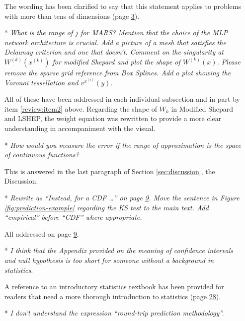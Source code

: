 \begin{itemize}[leftmargin=.5cm]
The wording has been clarified to say that this statement applies to problems with more than tens of dimensions (page \hyperlink{page.3}{3}).

\item[*] {\it What is the range of $j$ for MARS? Mention that the choice of the MLP network architecture is crucial. Add a picture of a mesh that satisfies the Delaunay criterion and one that doesn’t. Comment on the singularity at $W^{(k)}(x^{(k)})$ for modified Shepard and plot the shape of $W^{(k)}(x)$. Please remove the sparse grid reference from Box Splines. Add a plot showing the Voronoi tessellation and $v^{x^{(i)}}(y)$.}\vspace{.2cm}

All of these have been addressed in each individual subsection and in part by item \ref{review:item2} above. Regarding the shape of $W_k$ in Modified Shepard and LSHEP, the weight equation was rewritten to provide a more clear understanding in accompaniment with the visual.

\item[*] {\it How would you measure the error if the range of approximation is the space of continuous functions?}\vspace{.2cm}

This is answered in the last paragraph of Section \ref{sec:discussion}, the Discussion.

\item[*] {\it Rewrite as ``Instead, for a CDF \ldots'' on page \hyperlink{page.9}{9}. Move the sentence in Figure \ref{fig:prediction-example} regarding the KS test to the main text. Add ``empirical'' before ``CDF'' where appropriate.}\vspace{.2cm}

All addressed on page \hyperlink{page.9}{9}.

\item[*] {\it I think that the Appendix provided on the meaning of confidence intervals and null hypothesis is too short for someone without a background in statistics.}\vspace{.2cm}

A reference to an introductory statistics textbook has been provided for readers that need a more thorough introduction to statistics (page \hyperlink{page.28}{28}).

\item[*] {\it I don’t understand the expression “round-trip prediction methodology”.}\vspace{.2cm}


\end{itemize}
